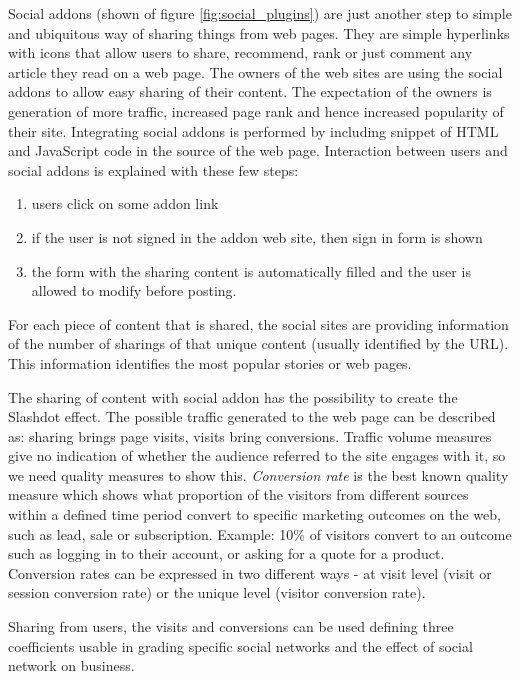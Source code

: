 \documentclass[conference]{IEEEtran}
\begin{document}
Social addons (shown of figure \ref{fig:social_plugins}) are just another step to simple
and ubiquitous way of sharing things from web pages. They are simple hyperlinks with icons that allow users to
share, recommend, rank or just comment any article they read on a web page. The
owners of the web sites are using the social addons to allow easy sharing of
their content. The expectation of the owners is generation of more traffic,
increased page rank and hence increased popularity of their site. Integrating
social addons is performed by including snippet of HTML and JavaScript code in
the source of the web page. Interaction between users and social addons is
explained with these few steps:

\begin{enumerate}
  \item users click on some addon link
  \item if the user is not signed in the addon web site, then sign in form is
  shown
  \item the form with the sharing content is automatically filled and the user is
allowed to modify before posting.
\end{enumerate}

For each piece of content that is shared, the social sites are providing
information of the number of sharings of that unique content (usually identified
by the URL). This information identifies the most popular stories or web pages.

The sharing of content with social addon has the possibility to create the
Slashdot effect. The possible traffic generated to the web page can be described
as: sharing brings page visits, visits bring conversions.
Traffic volume measures give no indication of whether the audience referred to
the site engages with it, so we need quality measures to show this. \emph{Conversion
rate} is the best known quality measure which shows what proportion of the
visitors from different sources within a defined time period convert to specific
marketing outcomes on the web, such as lead, sale or subscription. Example: 10\%
of visitors convert to an outcome such as logging in to their account, or asking
for a quote for a product. Conversion rates can be expressed in two different
ways - at visit level (visit or session conversion rate) or the unique level
(visitor conversion rate).

Sharing from users, the visits and conversions can be used defining three
coefficients usable in grading specific social networks and the effect of social
network on business.
\end{document}

